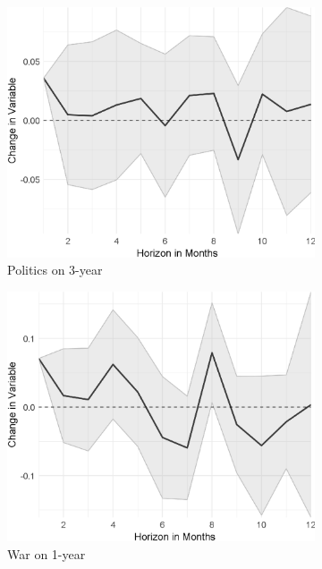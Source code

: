 \begin{figure}[H]
\begin{subfigure}{00.32\textwidth}
	\includegraphics[width=1\textwidth]{output/lp/baseline/diff/politics/politicsonexpectations3y_djn.eps}
	\caption{Politics on 3-year}
\end{subfigure}
\begin{subfigure}{00.32\textwidth}
	\includegraphics[width=1\textwidth]{output/lp/baseline/diff/war/waronexpectations1y_djn.eps}
	\caption{War on 1-year}
\end{subfigure}
\begin{subfigure}{00.32\textwidth}

\end{subfigure}
\end{figure}
